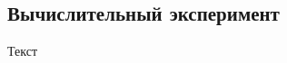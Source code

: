 \documentclass[../document.tex]{subfiles}
\begin{document}
\subsection{Вычислительный эксперимент}
\par Текст
\end{document}
